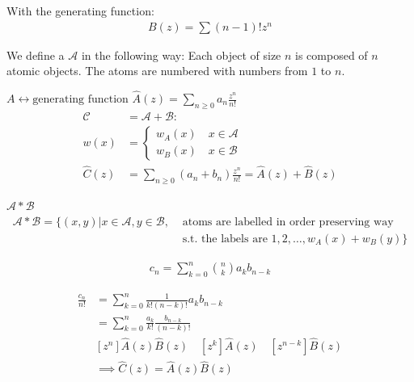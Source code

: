 With the generating function:
\begin{align*}
    B(z) = \sum (n-1)! z^n
\end{align*}

\begin{definition}
We define a  $\mathcal{A}$ in the following way: Each object of size $n$ is composed of $n$ atomic objects. The atoms are numbered with numbers from $1$ to $n$.
\end{definition}
$A \leftrightarrow \text{generating function } \hat{A}(z) = \displaystyle{\sum_{n\geq 0} a_n \frac{z^n}{n!}}$
\begin{align*}
    \mathcal{C} &= \mathcal{A}+\mathcal{B}: \\
         w(x) &= \begin{cases}
                w_A(x) \quad x\in \mathcal{A}\\
                w_B(x) \quad x\in \mathcal{B}
				\end{cases}\\
    \hat{C}(z) &= \sum_{n\geq 0} (a_n+b_n) \frac{z^n}{n!}
        = \hat{A}(z) + \hat{B}(z)
\end{align*}

\begin{definition}
$\mathcal{A} * \mathcal{B}$ \\
\begin{align*}
  \mathcal{A} * \mathcal{B} = \{ (x,y) | x \in \mathcal{A}, y \in \mathcal{B},
    &\text{ atoms are labelled in order preserving way }\\
    &\text{ s.t. the labels are } 1,2, \dotsc , w_A(x) + w_B(y) \}
\end{align*}
\end{definition}

\begin{align*}
    c_n = \sum_{k=0}^{n} {n \choose k} a_k b_{n-k}
\end{align*}


\begin{align*}
    \frac{c_n}{n!} &= \sum_{k=0}^{n} \frac{1}{k!(n-k)!} a_k b_{n-k}\\
    &= \sum_{k=0}^{n} \frac{a_k}{k!} \frac{b_{n-k}}{(n-k)!} \\
    &[z^n] \hat{A}(z)\hat{B}(z)
        \quad [z^k] \hat{A}(z)
        \quad [z^{n-k}] \hat{B}(z) \\
    &\implies \hat{C}(z) = \hat{A}(z) \hat{B}(z) \\
\end{align*}


